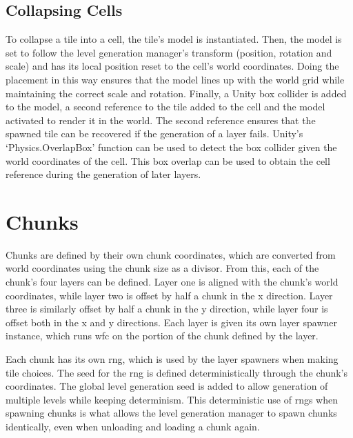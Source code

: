 \subsection{Collapsing Cells}\label{sec:collapsingCells}
To collapse a tile into a cell, the tile's model is instantiated. Then, the model is set to follow the level generation manager's transform (position, rotation and scale) and has its local position reset to the cell's world coordinates. Doing the placement in this way ensures that the model lines up with the world grid while maintaining the correct scale and rotation. Finally, a Unity box collider is added to the model, a second reference to the tile added to the cell and the model activated to render it in the world. The second reference ensures that the spawned tile can be recovered if the generation of a layer fails. Unity's `Physics.OverlapBox' function can be used to detect the box collider given the world coordinates of the cell. This box overlap can be used to obtain the cell reference during the generation of later layers.


\section{Chunks}
Chunks are defined by their own chunk coordinates, which are converted from world coordinates using the chunk size as a divisor. From this, each of the chunk's four layers can be defined. Layer one is aligned with the chunk's world coordinates, while layer two is offset by half a chunk in the x direction. Layer three is similarly offset by half a chunk in the y direction, while layer four is offset both in the x and y directions. Each layer is given its own layer spawner instance, which runs \acrshort{wfc} on the portion of the chunk defined by the layer.


Each chunk has its own \acrfull{rng}, which is used by the layer spawners when making tile choices. The seed for the \acrshort{rng} is defined deterministically through the chunk's coordinates. The global level generation seed is added to allow generation of multiple levels while keeping determinism. This deterministic use of \acrshort{rng}s when spawning chunks is what allows the level generation manager to spawn chunks identically, even when unloading and loading a chunk again.


